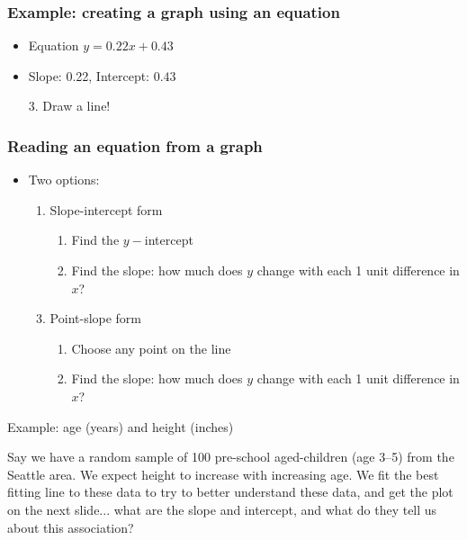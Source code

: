 \documentclass[11pt]{beamer}
\newcommand{\myframe}[1]{\begin{frame} \frametitle{#1}}
\begin{document}
\myframe{Example: creating a graph using an equation}
\centering
\begin{itemize}
\item Equation $y = 0.22x + 0.43$
\item[]
\item Slope: 0.22, Intercept: $0.43$
\item[]
\item[3.] Draw a line!
\end{itemize}
\end{frame}

\myframe{Reading an equation from a graph}
\begin{itemize}
\item Two options:
\begin{enumerate}
\item Slope-intercept form
\begin{enumerate}
\item Find the $y-$intercept
\item Find the slope: how much does $y$ change with each 1 unit difference in $x$?
\end{enumerate}
\item[]
\item Point-slope form
\begin{enumerate}
\item Choose any point on the line
\item Find the slope: how much does $y$ change with each 1 unit difference in $x$?
\end{enumerate}
\end{enumerate}
\end{itemize}

Example: age (years) and height (inches)

Say we have a random sample of 100 pre-school aged-children (age 3--5) from the Seattle area. We expect height to increase with increasing age. We fit the best fitting line to these data to try to better understand these data, and get the plot on the next slide... what are the slope and intercept, and what do they tell us about this association?
\end{frame}
\end{document}
